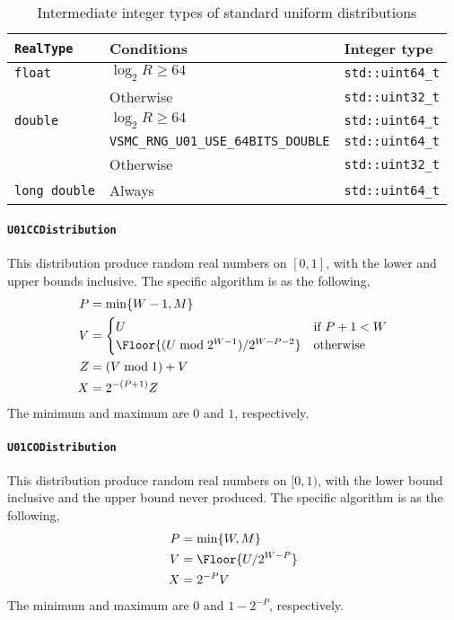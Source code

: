 \begin{table}
  \begin{tabularx}{\textwidth}{LlL}
    \toprule
    \verb|RealType| & Conditions & Integer type \\
    \midrule
    \verb|float| & $\log_2 R \ge 64$ & \verb|std::uint64_t| \\
                 & Otherwise         & \verb|std::uint32_t| \\
    \verb|double| & $\log_2 R \ge 64$ & \verb|std::uint64_t| \\
    & \verb|VSMC_RNG_U01_USE_64BITS_DOUBLE| & \verb|std::uint64_t| \\
    & Otherwise & \verb|std::uint32_t| \\
    \verb|long double| & Always & \verb|std::uint64_t| \\
    \bottomrule
  \end{tabularx}
  \caption{Intermediate integer types of standard uniform distributions}
  \label{tab:Intermediate integer types of standard uniform distributions}
\end{table}

\paragraph{\texttt{U01CCDistribution}}

This distribution produce random real numbers on $[0, 1]$, with the lower and
upper bounds inclusive. The specific algorithm is as the following,
\begin{align*}
  P &= \min\{W - 1, M\} \\
  V &= \begin{cases}
    U &\text{if } P + 1 < W \\
    \Floor{(U \bmod 2^{W - 1}) / 2^{W - P -2}} &\text{otherwise}
  \end{cases} \\
  Z &= (V \bmod 1) + V \\
  X &= 2^{-(P + 1)} Z
\end{align*}
The minimum and maximum are $0$ and $1$, respectively.

\paragraph{\texttt{U01CODistribution}}

This distribution produce random real numbers on $[0, 1)$, with the lower bound
inclusive and the upper bound never produced. The specific algorithm is as the
following,
\begin{align*}
  P &= \min\{W, M\} \\
  V &= \Floor{U / 2^{W - P}} \\
  X &= 2^{-P} V
\end{align*}
The minimum and maximum are $0$ and $1 - 2^{-P}$, respectively.

